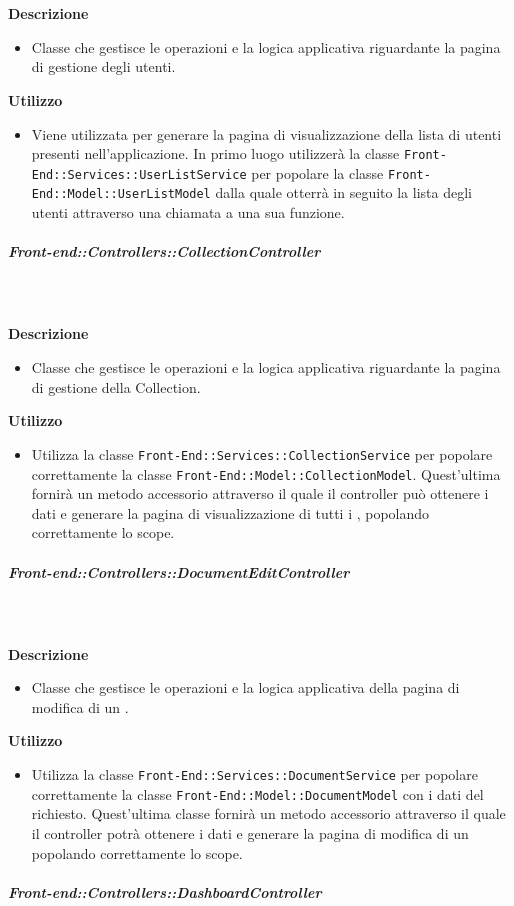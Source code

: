         \textbf{\\ \\ Descrizione} 
          \begin{itemize}
            \item[] Classe che gestisce le operazioni e la logica applicativa riguardante la pagina di gestione degli utenti.
          \end{itemize}      
        \textbf{Utilizzo}  
          \begin{itemize}
            \item[] Viene utilizzata per generare la pagina di visualizzazione della lista di utenti presenti nell'applicazione. In primo luogo utilizzerà la classe \texttt{Front-End::Services::UserListService} per popolare la classe \texttt{Front-End::Model::UserListModel} dalla quale otterrà in seguito la lista degli utenti attraverso una chiamata a una sua funzione.
          \end{itemize}
      \subparagraph{Front-end::Controllers::CollectionController}
        
        \textbf{\\ \\ Descrizione} 
          \begin{itemize}
            \item[] Classe che gestisce le operazioni e la logica applicativa riguardante la pagina di gestione della Collection.
          \end{itemize}      
        \textbf{Utilizzo}  
          \begin{itemize}
            \item[] Utilizza la classe \texttt{Front-End::Services::CollectionService} per popolare correttamente la classe \texttt{Front-End::Model::CollectionModel}. Quest'ultima fornirà un metodo accessorio attraverso il quale il controller può ottenere i dati e generare la pagina di visualizzazione di tutti i , popolando correttamente lo scope.
          \end{itemize}
      \subparagraph{Front-end::Controllers::DocumentEditController}
        
        \textbf{\\ \\ Descrizione} 
          \begin{itemize}
            \item[] Classe che gestisce le operazioni e la logica applicativa della pagina di modifica di un .
          \end{itemize}      
        \textbf{Utilizzo}  
          \begin{itemize}
            \item[] Utilizza la classe \texttt{Front-End::Services::DocumentService} per popolare correttamente la classe \texttt{Front-End::Model::DocumentModel} con i dati del  richiesto. Quest'ultima classe fornirà un metodo accessorio attraverso il quale il controller potrà ottenere i dati e generare la pagina di modifica di un  popolando correttamente lo scope.
          \end{itemize}
      \subparagraph{Front-end::Controllers::DashboardController}
        
